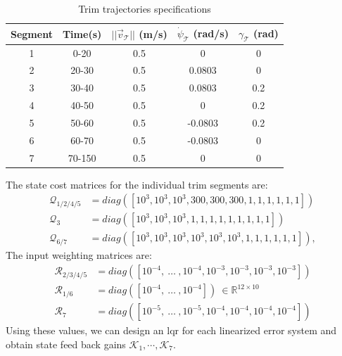 \begin{table}[htb]
\caption{Trim trajectories specifications}
\label{TABLE:TrimSpecifications}
\begin{center}
\begin{tabular}{| c | c | c | c | c |}
\hline
Segment&Time(s)&$||\vec{v}_{\mathcal{T}}||$ (m/s)&$\dot{\psi}_{\mathcal{T}}$ (rad/s)&$\gamma_{\mathcal{T}}$ (rad)\\ \hline
1&0-20&0.5&0&0\\ %
2&20-30&0.5&0.0803&0 \\ %
3&30-40&0.5&0.0803&0.2 \\ %
4&40-50&0.5&0&0.2 \\ %
5&50-60&0.5&-0.0803&0.2 \\ %
6&60-70&0.5&-0.0803&0 \\ %
7&70-150&0.5&0&0 \\ \hline
\end{tabular}
\end{center}
\end{table}  
 The state cost matrices for the individual trim segments are: 
\begin{align*}
	\mathcal{Q}_{1/2/4/5}&=diag([10^3, 10^3, 10^3, 300, 300, 300, 1, 1, 1, 1, 1, 1])\\
	\mathcal{Q}_{3}&=diag([10^3, 10^3, 10^3, 1, 1, 1, 1, 1, 1, 1, 1, 1])\\
	\mathcal{Q}_{6/7}&=diag([10^3, 10^3, 10^3, 10^3,  10^3, 10^3, 1, 1, 1, 1, 1, 1]),
\end{align*}
 The input weighting matrices are:
\begin{align*}
	\mathcal{R}_{2/3/4/5}&=diag([10^{-4},~\ldots~,10^{-4}, 10^{-3}, 10^{-3}, 10^{-3}, 10^{-3}])\\
	\mathcal{R}_{1/6}&=diag([10^{-4},~\ldots~,10^{-4}]) ~ \in \mathbb{R}^{12 \times 10}\\
	\mathcal{R}_{7}&=diag([10^{-5},~\ldots~,10^{-5}, 10^{-4}, 10^{-4}, 10^{-4}, 10^{-4}])
\end{align*}
Using these values, we can design an \ac{lqr} for each linearized error system and obtain state feed back gains $\mathcal{K}_{1}, \cdots, \mathcal{K}_{7}$.

